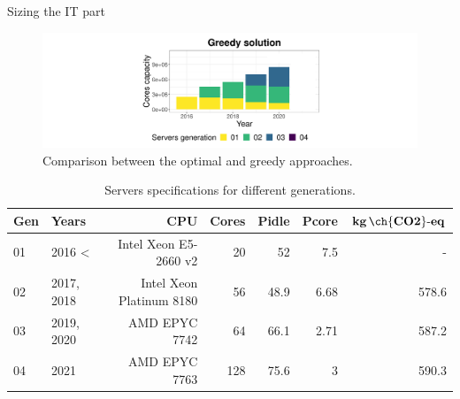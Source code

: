 \documentclass[Ligatures=TeX,table,svgnames,usetotalslideindicator,compress,10pt,aspectratio=169]{beamer}
\begin{document}
\begin{frame}{Sizing the IT part}
  \begin{center}
    \begin{figure}[h]    
      \centering
      \includegraphics[width=.9\textwidth]{images/cloud_federation_evolution_lifetime_year5.png}
      \caption{Comparison between the optimal and greedy approaches.}
    \end{figure}    
  \end{center}  

  \begin{table}[h]
  \tiny
  \label{tab:servers_specs} 
  \caption{Servers specifications for different generations.} \centering
  \begin{tabular}{|l|l|r|r|r|r|r|}
  \hline    
  \textbf{Gen} & \textbf{Years} & \textbf{CPU} &   \textbf{Cores} & \textbf{Pidle}  & \textbf{Pcore}  & \textbf{$\mathbf{kg\,\ch{CO2}\text{-}eq}$}  \\
  \hline
  01      &  2016 < & Intel Xeon E5-2660 v2 & 20 & 52 & 7.5  & -   \\
  \hline
  02 & 2017, 2018 & Intel Xeon Platinum 8180 & 56 & 48.9 & 6.68  & 578.6   \\
  \hline
  03   & 2019, 2020 & AMD EPYC 7742  & 64 & 66.1 & 2.71  & 587.2 \\
  \hline
  04   & 2021      & AMD EPYC 7763 & 128 & 75.6 & 3     & 590.3 \\
  \hline
  
\end{tabular}  
\end{table}

\end{frame}
\addtocounter{framenumber}{-1}
\end{document}
